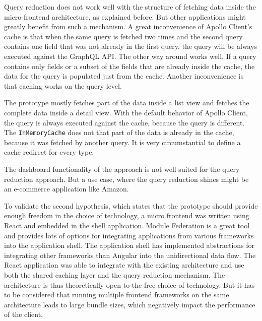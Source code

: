 \bigskip

\noindent Query reduction does not work well with the structure of fetching data inside the micro-frontend architecture, as explained before. But other applications might greatly benefit from such a mechanism. A great inconvenience of Apollo Client's cache is that when the same query is fetched two times and the second query contains one field that was not already in the first query, the query will be always executed against the GraphQL \ac{API}. The other way around works well. If a query contains only fields or a subset of the fields that are already inside the cache, the data for the query is populated just from the cache. Another inconvenience is that caching works on the query level. 

The prototype mostly fetches part of the data inside a list view and fetches the complete data inside a detail view. With the default behavior of Apollo Client, the query is always executed against the cache, because the query is different. The \texttt{InMemoryCache} does not that part of the data is already in the cache, because it was fetched by another query. It is very circumstantial to define a cache redirect for every type.

The dashboard functionality of the approach is not well suited for the query reduction approach. But a use case, where the query reduction shines might be an e-commerce application like Amazon.

\bigskip

\noindent To validate the second hypothesis, which states that the prototype should provide enough freedom in the choice of technology, a micro frontend was written using React and embedded in the shell application. Module Federation is a great tool and provides lots of options for integrating applications from various frameworks into the application shell. The application shell has implemented abstractions for integrating other frameworks than Angular into the unidirectional data flow. The React application was able to integrate with the existing architecture and use both the shared caching layer and the query reduction mechanism. The architecture is thus theoretically open to the free choice of technology. But it has to be considered that running multiple frontend frameworks on the same architecture leads to large bundle sizes, which negatively impact the performance of the client.
